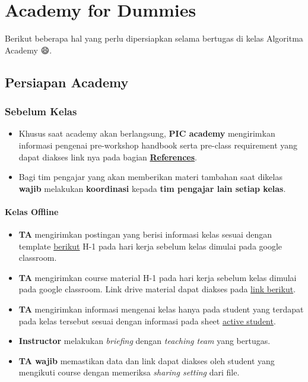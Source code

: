 \documentclass[
]{book}
\providecommand{\tightlist}{%
  \setlength{\itemsep}{0pt}\setlength{\parskip}{0pt}}
\begin{document}
\hypertarget{academy-for-dummies}{%
\chapter{Academy for Dummies}\label{academy-for-dummies}}

Berikut beberapa hal yang perlu dipersiapkan selama bertugas di kelas Algoritma Academy 😄.

\hypertarget{persiapan-academy}{%
\section{Persiapan Academy}\label{persiapan-academy}}

\hypertarget{sebelum-kelas}{%
\subsection{Sebelum Kelas}\label{sebelum-kelas}}

\begin{itemize}
\tightlist
\item
  Khusus saat academy akan berlangsung, \textbf{PIC academy} mengirimkan informasi pengenai pre-workshop handbook serta pre-class requirement yang dapat diakses link nya pada bagian \href{https://algoritma4dummies.netlify.app/references.html}{\textbf{References}}.
\item
  Bagi tim pengajar yang akan memberikan materi tambahan saat dikelas \textbf{wajib} melakukan \textbf{koordinasi} kepada \textbf{tim pengajar lain setiap kelas}.
\end{itemize}

\hypertarget{kelas-offline}{%
\subsubsection{Kelas Offline}\label{kelas-offline}}

\begin{itemize}
\tightlist
\item
  \textbf{TA} mengirimkan postingan yang berisi informasi kelas sesuai dengan template \href{https://docs.google.com/document/d/1leWbp3Eb2AwumFieuHiWStSNOXsKJQJD_h0tAhA2fLs/edit?usp=sharing}{berikut} H-1 pada hari kerja sebelum kelas dimulai pada google classroom.
\item
  \textbf{TA} mengirimkan course material H-1 pada hari kerja sebelum kelas dimulai pada google classroom. Link drive material dapat diakses pada \href{https://drive.google.com/drive/folders/1I1h0p4BkvkUYV8mtDU7bgswE_awOIxWY?usp=sharing}{link berikut}.
\item
  \textbf{TA} mengirimkan informasi mengenai kelas hanya pada student yang terdapat pada kelas tersebut sesuai dengan informasi pada sheet \href{https://docs.google.com/spreadsheets/d/12FB9410fhRhZp9jl5qLe7x-LGw0QTSfLujA-dE867JE/edit?usp=sharing}{active student}.
\item
  \textbf{Instructor} melakukan \emph{briefing} dengan \emph{teaching team} yang bertugas.
\item
  \textbf{TA wajib} memastikan data dan link dapat diakses oleh student yang mengikuti course dengan memeriksa \emph{sharing setting} dari file.
\end{itemize}
\end{document}
